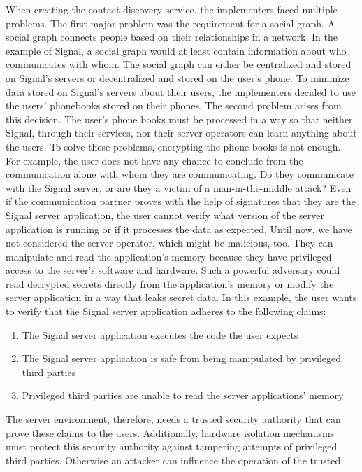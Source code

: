 When creating the contact discovery service, the implementers faced multiple
problems. The first major problem was the requirement for a social graph. A
social graph connects people based on their relationships in a network. In the
example of Signal, a social graph would at least contain information about who
communicates with whom. The social graph can either be centralized and stored on
Signal's servers or decentralized and stored on the user's phone. To minimize
data stored on Signal's servers about their users, the implementers decided to
use the users' phonebooks stored on their phones. The second problem arises from
this decision. The user's phone books must be processed in a way so that neither
Signal, through their services, nor their server operators can learn anything
about the users. To solve these problems, encrypting the phone books is not
enough. For example, the user does not have any chance to conclude from the
communication alone with whom they are communicating. Do they communicate with
the Signal server, or are they a victim of a man-in-the-middle attack? Even if
the communication partner proves with the help of signatures that they are the
Signal server application, the user cannot verify what version of the server
application is running or if it processes the data as expected. Until now, we
have not considered the server operator, which might be malicious, too. They can
manipulate and read the application's memory because they have privileged access
to the server's software and hardware. Such a powerful adversary could read
decrypted secrets directly from the application's memory or modify the server
application in a way that leaks secret data. In this example, the user wants to
verify that the Signal server application adheres to the following claims:
\begin{enumerate}
  \item The Signal server application executes the code the user expects
  \item The Signal server application is safe from being manipulated by
    privileged third parties
  \item Privileged third parties are unable to read the server applications'
    memory
\end{enumerate}
The server environment, therefore, needs a trusted security authority that can
prove these claims to the users. Additionally, hardware isolation mechanisms
must protect this security authority against tampering attempts of privileged
third parties. Otherwise an attacker can influence the operation of the trusted
